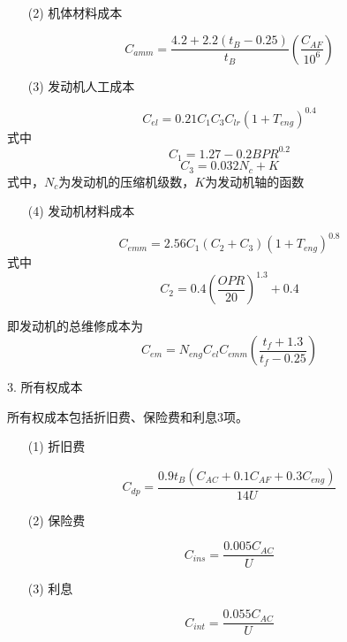 \documentclass[12pt,a4paper]{report}
\begin{document}
\begin{itemize}
    \item[(2)] 机体材料成本
\end{itemize}
\begin{equation}
\label{eq:airframematerial}
C_{amm}=\frac{4.2+2.2(t_B-0.25)}{t_B}(\frac{C_{AF}}{10^6})
\end{equation}
\begin{itemize}
    \item[(3)] 发动机人工成本
\end{itemize}
\begin{equation}
\label{eq:enginelabor}
C_{el}=0.21C_1C_3C_{lr}(1+T_{eng})^{0.4}
\end{equation}
式中\begin{equation}
\label{eq:c1}
C_1=1.27-0.2BPR^{0.2}
\end{equation}
\begin{equation}
\label{eq:elkc}
C_3=0.032N_c+K
\end{equation}
式中，$N_c$为发动机的压缩机级数，$K$为发动机轴的函数
\begin{itemize}
    \item[(4)] 发动机材料成本
\end{itemize}

\begin{equation}
\label{eq:enginematerial}
C_{emm}=2.56C_1(C_2+C_3)(1+T_{eng})^{0.8}
\end{equation}
式中\begin{equation}
\label{eq:c2}
C_2=0.4(\frac{OPR}{20})^{1.3}+0.4
\end{equation}

即发动机的总维修成本为
\begin{equation}
\label{eq:enginemaintenance}
C_{em}=N_{eng}C_{el}C_{emm}(\frac{t_f+1.3}{t_f-0.25})
\end{equation}

3. 所有权成本

所有权成本包括折旧费、保险费和利息3项。
\begin{itemize}
    \item[(1)] 折旧费
\end{itemize}
\begin{equation}
\label{eq:depreciation}
C_{dp}=\frac{0.9t_B(C_{AC}+0.1C_{AF}+0.3C_{eng})}{14U}
\end{equation}
\begin{itemize}
    \item[(2)] 保险费
\end{itemize}
\begin{equation}
\label{eq:hullinsurance}
C_{ins}=\frac{0.005C_{AC}}{U}
\end{equation}
\begin{itemize}
    \item[(3)] 利息
\end{itemize}
\begin{equation}
\label{eq:interest}
C_{int}=\frac{0.055C_{AC}}{U}
\end{equation}
\end{document}
